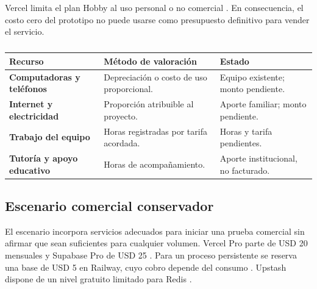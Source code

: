 Vercel limita el plan Hobby al uso personal o no comercial
\parencite{vercel_terms}. En consecuencia, el costo cero del prototipo no puede
usarse como presupuesto definitivo para vender el servicio.

\begin{table}[H]
\caption{Aportes en especie pendientes de valorar}
\begin{tabularx}{\textwidth}{>{\bfseries}p{3.3cm}p{3cm}X}
\toprule
Recurso & Método de valoración & Estado \\
\midrule
Computadoras y teléfonos & Depreciación o costo de uso proporcional. & Equipo existente; monto pendiente. \\
Internet y electricidad & Proporción atribuible al proyecto. & Aporte familiar; monto pendiente. \\
Trabajo del equipo & Horas registradas por tarifa acordada. & Horas y tarifa pendientes. \\
Tutoría y apoyo educativo & Horas de acompañamiento. & Aporte institucional, no facturado. \\
\bottomrule
\end{tabularx}
\caption*{\fuentepropia}
\end{table}

\subsection{Escenario comercial conservador}

El escenario incorpora servicios adecuados para iniciar una prueba comercial sin
afirmar que sean suficientes para cualquier volumen. Vercel Pro parte de USD 20
mensuales y Supabase Pro de USD 25 \parencite{vercel_pricing,supabase_pricing}.
Para un proceso persistente se reserva una base de USD 5 en Railway, cuyo cobro
depende del consumo \parencite{railway_pricing}. Upstash dispone de un nivel
gratuito limitado para Redis \parencite{upstash_pricing}.

